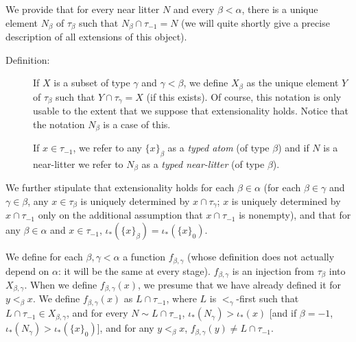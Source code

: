 \documentclass[112pt]{article}
\begin{document}
\begin{description}
We provide that for every near litter $N$ and every $\beta<\alpha$, there is a unique element $N_\beta$ of $\tau_\beta$ such that $N_\beta \cap \tau_{-1}=N$ (we will quite shortly give a precise description of all extensions of this object).

\begin{description}

\item[Definition:]  If $X$ is a subset of type $\gamma$ and $\gamma<\beta$, we define $X_\beta$ as the unique element $Y$ of $\tau_\beta$
such that $Y \cap \tau_\gamma = X$ (if this exists).  Of course, this notation is only usable to the extent that we suppose that extensionality holds.  Notice
that the notation $N_\beta$ is a case of this.

If $x \in \tau_{-1}$, we refer to any $\{x\}_\beta$ as a {\em typed atom\/} (of type $\beta$) and if $N$ is a near-litter we refer to $N_\beta$ as a {\em typed near-litter\/} (of type $\beta$).

\end{description}

We further stipulate that extensionality holds for each $\beta\in \alpha$ (for each $\beta\in \gamma$ and $\gamma \in \beta$, any $x \in \tau_\beta$ is uniquely determined by $x \cap \tau_\gamma$;  $x$ is uniquely determined by $x \cap \tau_{-1}$ only on the additional assumption that $x \cap \tau_{-1}$ is nonempty), and that for any $\beta \in \alpha$ and $x \in \tau_{-1}$, $\iota_*(\{x\}_\beta) = \iota_*(\{x\}_0)$.

We define for each $\beta,\gamma <\alpha$ a function $f_{\beta,\gamma}$ (whose definition does not actually depend on $\alpha$:  it will be the same at every stage).  $f_{\beta,\gamma}$ is an injection from $\tau_\beta$ into $X_{\beta,\gamma}$.
When we define $f_{\beta,\gamma}(x)$, we presume that we have already defined it for $y <_\beta x$.
We define $f_{\beta,\gamma}(x)$ as $L\cap \tau_{-1}$, where $L$ is $<_\gamma$-first such that $L\cap \tau_{-1} \in X_{\beta,\gamma}$, and for every $N \sim L \cap \tau_{-1}$, $\iota_*(N_\gamma)>\iota_*(x)$ [and if $\beta=-1$, $\iota_*(N_\gamma)>\iota_*(\{x\}_0)$], and for any $y<_\beta x$, $f_{\beta,\gamma}(y) \neq L\cap \tau_{-1}$.

\begin{comment}

Look at Sky's approach

\end{comment}




\end{description}
\end{document}
